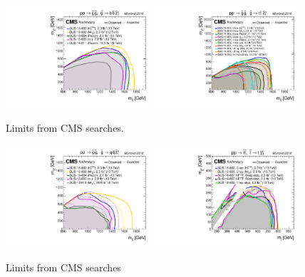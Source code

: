 
\begin{figure}[htbp]
\centering
    \includegraphics[width=0.48\textwidth]{figures/SusySearches/T1bbbb_Moriond.pdf}
    \includegraphics[width=0.48\textwidth]{figures/SusySearches/T1tttt_Moriond.pdf} \\
    \caption{Limits from CMS searches.}
    \label{fig:limits5}
\end{figure}

\begin{figure}[htbp]
\centering
    \includegraphics[width=0.48\textwidth]{figures/SusySearches/T1qqqq_Moriond.pdf}
    \includegraphics[width=0.48\textwidth]{figures/SusySearches/T2tt_Moriond.pdf} \\
    \caption{Limits from CMS searches}
    \label{fig:limits6}
\end{figure}



